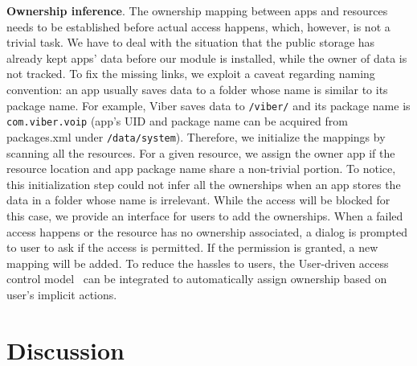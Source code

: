 \documentclass{sig-alternate}
\begin{document}
\noindent\textbf{Ownership inference}. The ownership mapping between apps and resources needs to be established before actual access happens, which, however, is not a trivial task. We have to deal with the situation that the public storage has already kept apps' data before our module is installed, while the owner of data is not tracked. To fix the missing links, we exploit a caveat regarding naming convention: an app usually saves data to a folder whose name is similar to its package name. For example, Viber saves data to \texttt{/viber/} and its package name is \texttt{com.viber.voip} (app's UID and package name can be acquired from packages.xml under \texttt{/data/system}). Therefore, we initialize the mappings by scanning all the resources. For a given resource, we assign the owner app if the resource location and app package name share a non-trivial portion. To notice, this initialization step could not infer all the ownerships when an app stores the data in a folder whose name is irrelevant. While the access will be blocked for this case, we provide an interface for users to add the ownerships. When a failed access happens or the resource has no ownership associated, a dialog is prompted to user to ask if the access is permitted. If the permission is granted, a new mapping will be added. To reduce the hassles to users, the User-driven access control model~\cite{roesner2012user} can be integrated to automatically assign ownership based on user's implicit actions.


\section{Discussion}
\label{sec:discussion}
\end{document}
